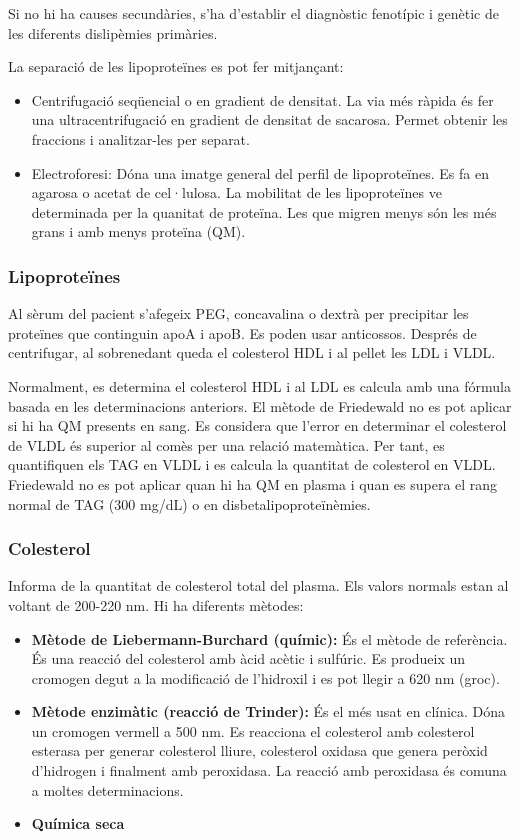 Si no hi ha causes secundàries, s'ha d'establir el diagnòstic
fenotípic i genètic de les diferents dislipèmies primàries.

La separació de les lipoproteïnes es pot fer mitjançant:
\begin{itemize}
\item Centrifugació seqüencial o en gradient de densitat. La via més
  ràpida és fer una ultracentrifugació en gradient de densitat de
  sacarosa. Permet obtenir les fraccions i analitzar-les per separat.

\item Electroforesi: Dóna una imatge general del perfil de
  lipoproteïnes. Es fa en agarosa o acetat de cel·lulosa. La mobilitat
  de les lipoproteïnes ve determinada per la quanitat de proteïna. Les
  que migren menys són les més grans i amb menys proteïna (QM).
\end{itemize}

\subsubsection{Lipoproteïnes}
\label{sec:lipoproteines}
Al sèrum del pacient s'afegeix PEG, concavalina o dextrà per
precipitar les proteïnes que continguin apoA i apoB. Es poden usar
anticossos. Després de centrifugar, al sobrenedant queda el colesterol
HDL i al pellet les LDL i VLDL. 

Normalment, es determina el colesterol HDL i al LDL es calcula amb una
fórmula basada en les determinacions anteriors. El mètode de
Friedewald no es pot aplicar si hi ha QM presents en sang. Es
considera que l'error en determinar el colesterol de VLDL és superior
al comès per una relació matemàtica. Per tant, es quantifiquen els TAG
en VLDL i es calcula la quantitat de colesterol en VLDL. Friedewald no
es pot aplicar quan hi ha QM en plasma i quan es supera el rang normal
de TAG (300 mg/dL) o en disbetalipoproteïnèmies.

\subsubsection{Colesterol}
\label{sec:colesterol}
Informa de la quantitat de colesterol total del plasma. Els valors
normals estan al voltant de 200-220 nm. Hi ha diferents mètodes:
\begin{itemize}
\item \textbf{Mètode de Liebermann-Burchard (químic):} És el mètode de
  referència. És una reacció del colesterol amb àcid acètic i
  sulfúric. Es produeix un cromogen degut a la modificació de
  l'hidroxil i es pot llegir a 620 nm (groc).

\item \textbf{Mètode enzimàtic (reacció de Trinder):} És el més usat en
  clínica. Dóna un cromogen vermell a 500 nm. Es reacciona el
  colesterol amb colesterol esterasa per generar colesterol lliure,
  colesterol oxidasa que genera peròxid d'hidrogen i finalment amb
  peroxidasa. La reacció amb peroxidasa és comuna a moltes
  determinacions.

\item \textbf{Química seca}
\end{itemize}

